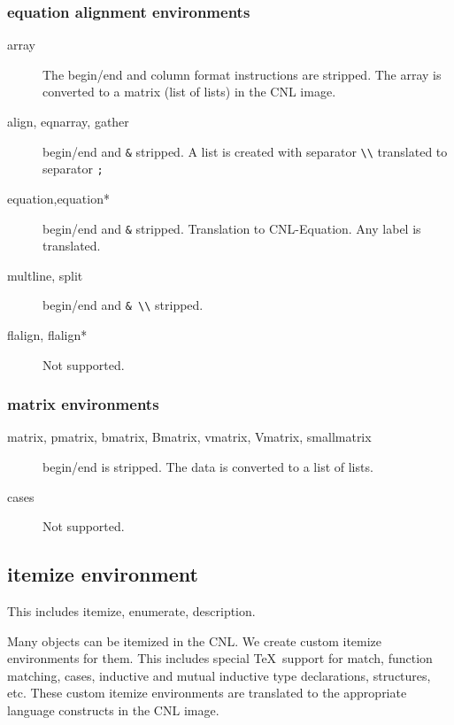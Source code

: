 \documentclass[12pt]{amsart}
\begin{document}
\subsubsection{equation alignment environments}

\begin{description}
\item [array] The begin/end and column format
instructions are stripped.  The array is converted
to a matrix (list of lists) in the CNL image.
\item [align, eqnarray, gather] begin/end and \verb!&! stripped.
A list is created with separator \verb!\\! translated
to separator \verb!;!
\item [equation,equation*]
begin/end and \verb!&! stripped.
Translation to CNL-Equation.  Any label is translated.
\item [multline, split]  begin/end and \verb!& \\! stripped.
\item [flalign, flalign*]  Not supported.
\end{description}

\subsubsection{matrix environments}

\begin{description}
\item [matrix, pmatrix, bmatrix, Bmatrix, vmatrix, Vmatrix, smallmatrix]   begin/end is stripped. The data is converted to a list of lists.
\item [cases] Not supported.
\end{description}



\subsection{itemize environment}

This includes itemize, enumerate, description.

Many objects can be itemized in the CNL.  We create
custom itemize environments for them.
This includes special \TeX\ support for match, function matching,
cases, inductive
and mutual inductive type declarations, structures, etc.
These custom itemize environments are translated to the
appropriate language constructs in the CNL image.
\end{document}
